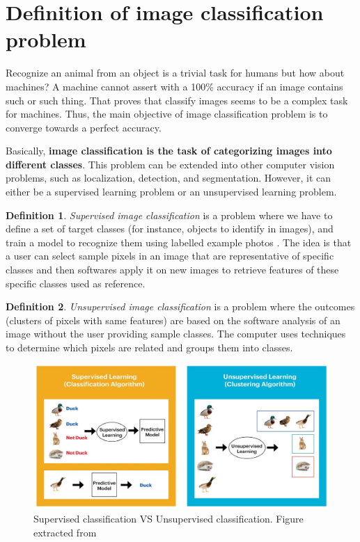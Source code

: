 \documentclass[11pt, openany]{report}
\theoremstyle{plain}
\theoremstyle{definition}
\newtheorem{defn}{Definition}[section]
\theoremstyle{remark}
\begin{document}
\section{Definition of image classification problem}
Recognize an animal from an object is a trivial task for humans but how about machines? A machine cannot assert with a 100\% accuracy if an image contains such or such thing. That proves that classify images seems to be a complex task for machines. Thus, the main objective of image classification problem is to converge towards a perfect accuracy. 

Basically, \textbf{image classification is the task of categorizing images into different classes}. This problem can be extended into other computer vision problems, such as localization, detection, and segmentation. However, it can either be a supervised learning problem or an unsupervised learning problem. 

\begin{defn}
\textit{Supervised image classification} is a problem where we have to define a set of target classes (for instance, objects to identify in images), and train a model to recognize them using labelled example photos \cite{Google-2}. The idea is that a user can select sample pixels in an image that are representative of specific classes and then softwares apply it on new images to retrieve features of these specific classes used as reference. 
\end{defn}

\begin{defn}
\textit{Unsupervised image classification} is a problem where the outcomes (clusters of pixels with same features) are based on the software analysis of an image without the user providing sample classes. The computer uses techniques to determine which pixels are related and groups them into classes. 
\end{defn}

\begin{figure}[h]
  \centering
  \includegraphics[scale=0.5]{figures/supervised-unsupervised-2.png}
  \caption{Supervised classification VS Unsupervised classification. Figure extracted from \cite{supervisedVSunsupervised-2}}
  \label{fig:supervised-unsupervised-2}
\end{figure}
\end{document}
